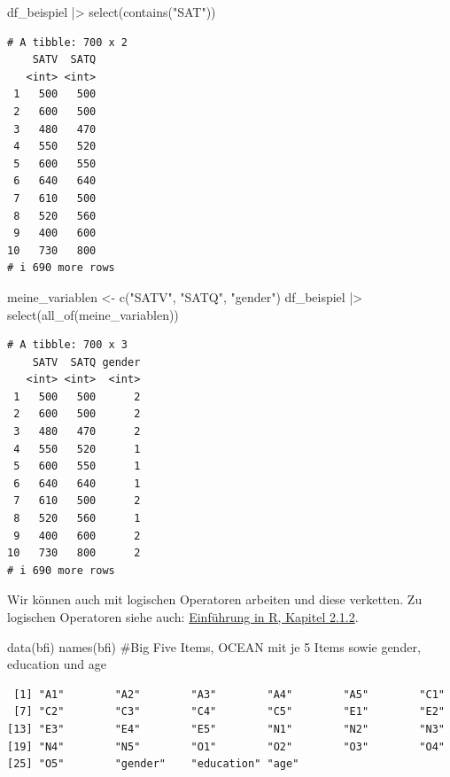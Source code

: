\documentclass[
  letterpaper,
  DIV=11,
  numbers=noendperiod]{scrreprt}
\newenvironment{Shaded}{\begin{snugshade}}{\end{snugshade}}
\newcommand{\CommentTok}[1]{\textcolor[rgb]{0.37,0.37,0.37}{#1}}
\newcommand{\FunctionTok}[1]{\textcolor[rgb]{0.28,0.35,0.67}{#1}}
\newcommand{\NormalTok}[1]{\textcolor[rgb]{0.00,0.23,0.31}{#1}}
\newcommand{\OtherTok}[1]{\textcolor[rgb]{0.00,0.23,0.31}{#1}}
\newcommand{\SpecialCharTok}[1]{\textcolor[rgb]{0.37,0.37,0.37}{#1}}
\newcommand{\StringTok}[1]{\textcolor[rgb]{0.13,0.47,0.30}{#1}}
\begin{document}
\begin{Shaded}
\begin{Highlighting}[]
\NormalTok{df\_beispiel }\SpecialCharTok{|\textgreater{}} \FunctionTok{select}\NormalTok{(}\FunctionTok{contains}\NormalTok{(}\StringTok{"SAT"}\NormalTok{))}
\end{Highlighting}
\end{Shaded}

\begin{verbatim}
# A tibble: 700 x 2
    SATV  SATQ
   <int> <int>
 1   500   500
 2   600   500
 3   480   470
 4   550   520
 5   600   550
 6   640   640
 7   610   500
 8   520   560
 9   400   600
10   730   800
# i 690 more rows
\end{verbatim}

\begin{Shaded}
\begin{Highlighting}[]
\NormalTok{meine\_variablen }\OtherTok{\textless{}{-}} \FunctionTok{c}\NormalTok{(}\StringTok{"SATV"}\NormalTok{, }\StringTok{"SATQ"}\NormalTok{, }\StringTok{"gender"}\NormalTok{)}
\NormalTok{df\_beispiel }\SpecialCharTok{|\textgreater{}} \FunctionTok{select}\NormalTok{(}\FunctionTok{all\_of}\NormalTok{(meine\_variablen))}
\end{Highlighting}
\end{Shaded}

\begin{verbatim}
# A tibble: 700 x 3
    SATV  SATQ gender
   <int> <int>  <int>
 1   500   500      2
 2   600   500      2
 3   480   470      2
 4   550   520      1
 5   600   550      1
 6   640   640      1
 7   610   500      2
 8   520   560      1
 9   400   600      2
10   730   800      2
# i 690 more rows
\end{verbatim}

Wir können auch mit logischen Operatoren arbeiten und diese verketten.
Zu logischen Operatoren siehe auch:
\href{https://methodenlehre.github.io/einfuehrung-in-R/chapters/02-R-language.html\#logische-operatoren-und-funktionen}{Einführung
in R, Kapitel 2.1.2}.

\begin{Shaded}
\begin{Highlighting}[]
\FunctionTok{data}\NormalTok{(bfi)  }
\FunctionTok{names}\NormalTok{(bfi) }\CommentTok{\#Big Five Items, OCEAN mit je 5 Items sowie gender, education und age}
\end{Highlighting}
\end{Shaded}

\begin{verbatim}
 [1] "A1"        "A2"        "A3"        "A4"        "A5"        "C1"       
 [7] "C2"        "C3"        "C4"        "C5"        "E1"        "E2"       
[13] "E3"        "E4"        "E5"        "N1"        "N2"        "N3"       
[19] "N4"        "N5"        "O1"        "O2"        "O3"        "O4"       
[25] "O5"        "gender"    "education" "age"      
\end{verbatim}
\end{document}
